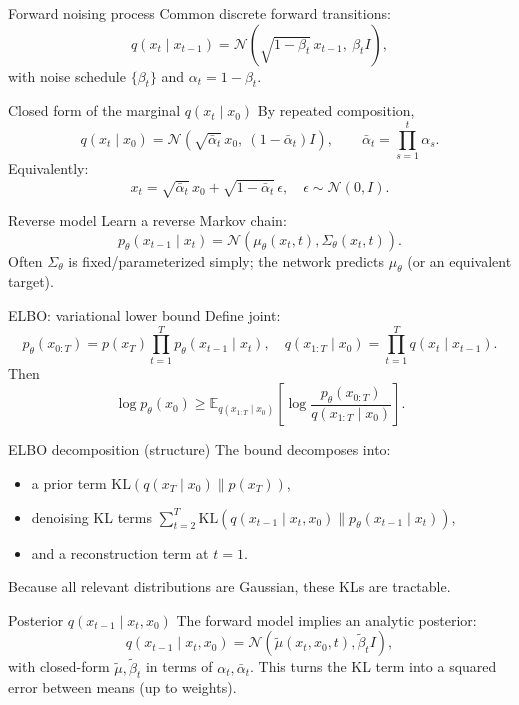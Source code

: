 \documentclass[aspectratio=169]{beamer}
\begin{document}
\begin{frame}{Forward noising process}
Common discrete forward transitions:
\[
q(x_t\mid x_{t-1})=\mathcal{N}\!\left(\sqrt{1-\beta_t}\,x_{t-1},\ \beta_t I\right),
\]
with noise schedule \(\{\beta_t\}\) and \(\alpha_t=1-\beta_t\).
\end{frame}

\begin{frame}{Closed form of the marginal \(q(x_t\mid x_0)\)}
By repeated composition,
\[
q(x_t\mid x_0)=\mathcal{N}\!\left(\sqrt{\bar\alpha_t}\,x_0,\ (1-\bar\alpha_t)I\right),
\qquad \bar\alpha_t=\prod_{s=1}^t \alpha_s.
\]
Equivalently:
\[
x_t=\sqrt{\bar\alpha_t}\,x_0+\sqrt{1-\bar\alpha_t}\,\epsilon,\quad \epsilon\sim \mathcal{N}(0,I).
\]
\end{frame}

\begin{frame}{Reverse model}
Learn a reverse Markov chain:
\[
p_\theta(x_{t-1}\mid x_t)=\mathcal{N}(\mu_\theta(x_t,t),\Sigma_\theta(x_t,t)).
\]
Often \(\Sigma_\theta\) is fixed/parameterized simply; the network predicts \(\mu_\theta\) (or an equivalent target).
\end{frame}

\begin{frame}{ELBO: variational lower bound}
Define joint:
\[
p_\theta(x_{0:T}) = p(x_T)\prod_{t=1}^T p_\theta(x_{t-1}\mid x_t),
\quad
q(x_{1:T}\mid x_0)=\prod_{t=1}^T q(x_t\mid x_{t-1}).
\]
Then
\[
\log p_\theta(x_0) \ge \mathbb{E}_{q(x_{1:T}\mid x_0)}\left[\log \frac{p_\theta(x_{0:T})}{q(x_{1:T}\mid x_0)}\right].
\]
\end{frame}

\begin{frame}{ELBO decomposition (structure)}
The bound decomposes into:
\begin{itemize}
\item a prior term \(\mathrm{KL}(q(x_T\mid x_0)\|p(x_T))\),
\item denoising KL terms \(\sum_{t=2}^T \mathrm{KL}(q(x_{t-1}\mid x_t,x_0)\|p_\theta(x_{t-1}\mid x_t))\),
\item and a reconstruction term at \(t=1\).
\end{itemize}
Because all relevant distributions are Gaussian, these KLs are tractable.
\end{frame}

\begin{frame}{Posterior \(q(x_{t-1}\mid x_t,x_0)\)}
The forward model implies an analytic posterior:
\[
q(x_{t-1}\mid x_t,x_0)=\mathcal{N}(\tilde\mu(x_t,x_0,t),\tilde\beta_t I),
\]
with closed-form \(\tilde\mu,\tilde\beta_t\) in terms of \(\alpha_t,\bar\alpha_t\).
This turns the KL term into a squared error between means (up to weights).
\end{frame}
\end{document}
